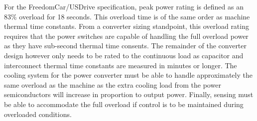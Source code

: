For the FreedomCar/USDrive specification, peak power rating is defined as an
83\% overload for 18 seconds.
This overload time is of the same order as machine thermal time constants.
From a converter sizing standpoint, this overload rating requires that the
power switches are capable of handling the full overload power as they have
sub-second thermal time consents.
The remainder of the converter design however only needs to be rated to the
continuous load as capacitor and interconnect thermal time constants are
measured in minutes or longer.
The cooling system for the power converter must be able to handle
approximately the same overload as the machine as the extra cooling load from
the power semiconductors will increase in proportion to output power.
Finally, sensing must be able to accommodate the full overload if control is to
be maintained during overloaded conditions.
